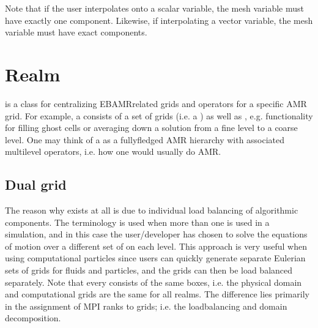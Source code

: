 \documentclass[letterpaper,10pt,english]{sphinxmanual}
\begin{document}
\begin{sphinxVerbatim}[commandchars=\\\{\},formatcom=\scriptsize]
 

 
\end{sphinxVerbatim}

Note that if the user interpolates onto a scalar variable, the mesh variable must have exactly one component.
Likewise, if interpolating a vector variable, the mesh variable must have exact  components.


\section{Realm}
\label{\detokenize{Source/Realm:realm}}\label{\detokenize{Source/Realm:chap-realm}}\label{\detokenize{Source/Realm::doc}}
 is a class for centralizing EBAMR\sphinxhyphen{}related grids and operators for a specific AMR grid.
For example, a  consists of a set of grids (i.e. a ) as well as , e.g. functionality for filling ghost cells or averaging down a solution from a fine level to a coarse level.
One may think of a  as a fully\sphinxhyphen{}fledged AMR hierarchy with associated multilevel operators, i.e. how one would usually do AMR.


\subsection{Dual grid}
\label{\detokenize{Source/Realm:dual-grid}}
The reason why  exists at all is due to individual load balancing of algorithmic components.
The terminology  is used when more than one  is used in a simulation, and in this case the user/developer has chosen to solve the equations of motion over a different set of  on each level.
This approach is very useful when using computational particles since users can quickly generate separate Eulerian sets of grids for fluids and particles, and the grids can then be load balanced separately.
Note that every  consists of the same boxes, i.e. the physical domain and computational grids are the same for all realms.
The difference lies primarily in the assignment of MPI ranks to grids; i.e. the load\sphinxhyphen{}balancing and domain decomposition.
\end{document}
